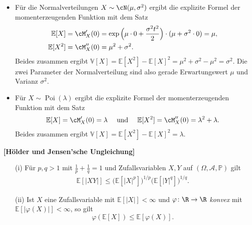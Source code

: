 \begin{beispiel}  \abs

	\begin{itemize}
		\item F\"ur die Normalverteilungen $X \sim \cN(\mu, \sigma^2)$ ergibt die explizite Formel der momenterzeugenden Funktion mit dem Satz
		\begin{align*}
		\mathbb{E}[X] &= \cM_X'(0) = \exp\Big(\mu\cdot0 + \frac{\sigma^2 t^2}{2}\Big)\cdot (\mu + \sigma^2 \cdot 0) = \mu, \\
		\mathbb{E}[X^2] &= \cM_X''(0) = \mu^2 + \sigma^2.
		\end{align*}
		Beides zusammen ergibt $\mathbb{V}[X] = \mathbb{E}[X^2] - \mathbb{E}[X]^2 = \mu^2 + \sigma^2 - \mu^2 = \sigma^2$. Die zwei Parameter der Normalverteilung sind also gerade Erwartungswert $\mu$ und Varianz $\sigma^2$.
		\item F\"ur $X \sim \operatorname{Poi}(\lambda)$ ergibt die explizite Formel der momenterzeugenden Funktion mit dem Satz
		\begin{align*}
		\mathbb{E}[X] = \cM_X'(0) = \lambda \quad \text{ und }\quad  \mathbb{E}[X^2] = \cM_X''(0) = \lambda^2 + \lambda.
		\end{align*}
		Beides zusammen ergibt $\mathbb{V}[X] = \mathbb{E}[X^2] - \mathbb{E}[X]^2 =\lambda$.
	\end{itemize}
\end{beispiel}


\begin{prop}\label{jensen}
 \textbf{[H\"older und Jensen’sche Ungleichung]}


\begin{itemize}
\item[(i)] F\"ur $p,q>1$ mit $\frac{1}{p}+\frac{1}{q}=1$ und Zufallsvariablen $X,Y$ auf $(\Omega, \mathcal A, \mathbb P)$ gilt
\begin{align*}
	\mathbb E[|XY|]\leq \big(\mathbb E[|X|^p]\big)^{1/p} \big(\mathbb E[|Y|^q]\big)^{1/q}.
\end{align*}
\item[(ii)]
	Ist $X$ eine Zufallsvariable mit $\mathbb{E}[|X|] < \infty$ und $\varphi \colon \R \to \R $ \textit{konvex} mit $\mathbb{E}[|\varphi(X)|] < \infty$, so gilt
	\[ \varphi(\mathbb{E}[X]) \leq \mathbb{E}[\varphi(X)]. \]
\end{itemize}
\end{prop}


